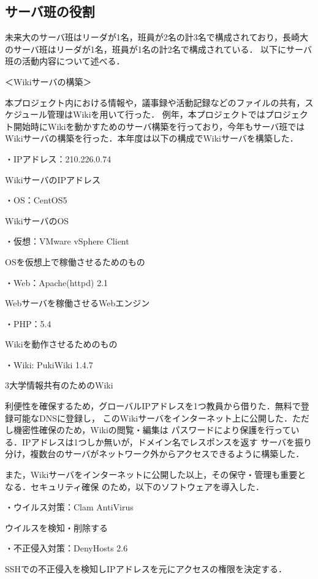 \subsection{サーバ班の役割}
\par 未来大のサーバ班はリーダが1名，班員が2名の計3名で構成されており，長崎大のサーバ班はリーダが1名，班員が1名の計2名で構成されている．
以下にサーバ班の活動内容について述べる．
\\
\par ＜Wikiサーバの構築＞
\par
本プロジェクト内における情報や，議事録や活動記録などのファイルの共有，スケジュール管理はWikiを用いて行った．
例年，本プロジェクトではプロジェクト開始時にWikiを動かすためのサーバ構築を行っており，今年もサーバ班では
Wikiサーバの構築を行った．本年度は以下の構成でWikiサーバを構築した．
\\
\par ・IPアドレス：210.226.0.74
\par WikiサーバのIPアドレス
\par ・OS：CentOS5
\par WikiサーバのOS
\par ・仮想：VMware vSphere Client
\par OSを仮想上で稼働させるためのもの
\par ・Web：Apache(httpd) 2.1
\par Webサーバを稼働させるWebエンジン
\par ・PHP：5.4
\par Wikiを動作させるためのもの
\par ・Wiki: PukiWiki 1.4.7
\par 3大学情報共有のためのWiki
\\
\par
利便性を確保するため，グローバルIPアドレスを1つ教員から借りた．無料で登録可能なDNSに登録し，
このWikiサーバをインターネット上に公開した．ただし機密性確保のため，Wikiの閲覧・編集は
パスワードにより保護を行っている．IPアドレスは1つしか無いが，ドメイン名でレスポンスを返す
サーバを振り分け，複数台のサーバがネットワーク外からアクセスできるように構築した．
\par
また，Wikiサーバをインターネットに公開した以上，その保守・管理も重要となる．セキュリティ確保
のため，以下のソフトウェアを導入した．
\\
\par ・ウイルス対策：Clam AntiVirus
\par ウイルスを検知・削除する
\par ・不正侵入対策：DenyHosts 2.6
\par SSHでの不正侵入を検知しIPアドレスを元にアクセスの権限を決定する．
